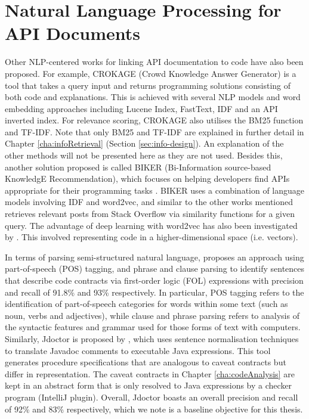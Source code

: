\section{Natural Language Processing for API Documents}
\label{sec:related-nlp}
Other NLP-centered works for linking API documentation to code have also been proposed. For example, CROKAGE (Crowd Knowledge Answer Generator) is a tool that takes a query input and returns programming solutions consisting of both code and explanations. This is achieved with several NLP models and word embedding approaches including Lucene Index, FastText, IDF and an API inverted index. For relevance scoring, CROKAGE also utilises the BM25 function and TF-IDF. Note that only BM25 and TF-IDF are explained in further detail in Chapter \ref{cha:infoRetrieval} (Section \ref{sec:info-design}). An explanation of the other methods will not be presented here as they are not used. Besides this, another solution proposed is called BIKER (Bi-Information source-based KnowledgE Recommendation), which focuses on helping developers find APIs appropriate for their programming tasks \cite{huang2018api}. BIKER uses a combination of language models involving IDF and word2vec, and similar to the other works mentioned retrieves relevant posts from Stack Overflow via similarity functions for a given query. The advantage of deep learning with word2vec has also been investigated by \cite{van2017combining}. This involved representing code in a higher-dimensional space (i.e. vectors). \bigbreak

In terms of parsing semi-structured natural language, \cite{pandita2012inferring} proposes an approach using part-of-speech (POS) tagging, and phrase and clause parsing to identify sentences that describe code contracts via first-order logic (FOL) expressions with precision and recall of 91.8\% and 93\% respectively. In particular, POS tagging refers to the identification of part-of-speech categories for words within some text (such as noun, verbs and adjectives), while clause and phrase parsing refers to analysis of the syntactic features and grammar used for those forms of text with computers. Similarly, Jdoctor is proposed by \cite{blasi2018translating}, which uses sentence normalisation techniques to translate Javadoc comments to executable Java expressions. This tool generates procedure specifications that are analogous to caveat contracts but differ in representation.  The caveat contracts in Chapter \ref{cha:codeAnalysis} are kept in an abstract form that is only resolved to Java expressions by a checker program (IntelliJ plugin). Overall, Jdoctor boasts an overall precision and recall of 92\% and 83\% respectively, which we note is a baseline objective for this thesis.

